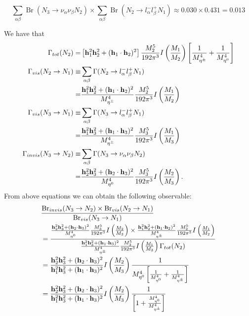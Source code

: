 \begin{equation}
  \sum_{\alpha\beta}\operatorname{Br}(N_3\to\nu_\alpha\nu_\beta N_2)\times\sum_{\alpha\beta}\operatorname{Br}(N_2\to l_\alpha^-l_\beta^+ N_1)\approx0.030\times0.431=0.013
\end{equation}


We have that
\begin{align*}
 \Gamma_{tot}(N_2)=&\left[{\bf h}^2_1{\bf h}^2_2+({\bf h}_1\cdot {\bf h}_2)^2\right]\frac{M_2^5}{192\pi^3}I\left(\frac{M_1}{M_2} \right)\left[ \frac{1}{M^4_{\eta^\pm}}+\frac{1}{M^4_{\eta^0}}\right]\\
\Gamma_{vis}(N_2\to N_1)\equiv& \sum_{\alpha\beta}\Gamma(N_2\to l_\alpha^- l_\beta^+ N_1)\\
   =&\frac{{\bf h}^2_1{\bf h}^2_2+({\bf h}_1\cdot {\bf h}_2)^2}{M^4_{\eta^\pm}}\frac{M_2^5}{192\pi^3}I\left(\frac{M_1}{M_2} \right)\\
\Gamma_{vis}(N_3\to N_1)\equiv& \sum_{\alpha\beta}\Gamma(N_3\to l_\alpha^- l_\beta^+ N_1)\\
   =&\frac{{\bf h}^2_1{\bf h}^2_3+({\bf h}_1\cdot {\bf h}_3)^2}{M^4_{\eta^\pm}}\frac{M_3^5}{192\pi^3}I\left(\frac{M_1}{M_3} \right)\\
\Gamma_{invis}(N_3\to N_2)\equiv& \sum_{\alpha\beta}\Gamma(N_3\to \nu_\alpha \nu_\beta N_2)\\
   =&\frac{{\bf h}^2_2{\bf h}^2_3+({\bf h}_2\cdot {\bf h}_3)^2}{M^4_{\eta^0}}\frac{M_3^5}{192\pi^3}I\left(\frac{M_2}{M_3} \right).
\end{align*}
From above equations we can obtain the following observable:
\begin{align*}
 &\frac{\mbox{Br}_{invis}(N_3\to N_2)\times \mbox{Br}_{vis}(N_2\to N_1)}{\mbox{Br}_{vis}(N_3\to N_1)}\\
&=\frac{\frac{{\bf h}^2_2{\bf h}^2_3+({\bf h}_2\cdot {\bf h}_3)^2}{M^4_{\eta^0}}\frac{M_3^5}{192\pi^3}I\left(\frac{M_2}{M_3} \right)\times \frac{{\bf h}^2_1{\bf h}^2_2+({\bf h}_1\cdot {\bf h}_2)^2}{M^4_{\eta^\pm}}\frac{M_2^5}{192\pi^3}I\left(\frac{M_1}{M_2} \right)}{\frac{{\bf h}^2_1{\bf h}^2_3+({\bf h}_1\cdot {\bf h}_3)^2}{M^4_{\eta^\pm}}\frac{M_3^5}{192\pi^3}I\left(\frac{M_1}{M_3} \right)\Gamma_{tot}(N_2)}\\
&=\frac{{\bf h}^2_2{\bf h}^2_3+({\bf h}_2\cdot {\bf h}_3)^2}{{\bf h}^2_1{\bf h}^2_3+({\bf h}_1\cdot {\bf h}_3)^2}I\left(\frac{M_2}{M_3} \right)\frac{1}{M^4_{\eta^0}\left[\frac{1}{M^4_{\eta^0}}+\frac{1}{M^4_{\eta^\pm}} \right] }\\
&=\frac{{\bf h}^2_2{\bf h}^2_3+({\bf h}_2\cdot {\bf h}_3)^2}{{\bf h}^2_1{\bf h}^2_3+({\bf h}_1\cdot {\bf h}_3)^2}I\left(\frac{M_2}{M_3} \right)\frac{1}{\left[1+\frac{M^4_{\eta^0}}{M^4_{\eta^\pm}} \right]}
\end{align*}
 


